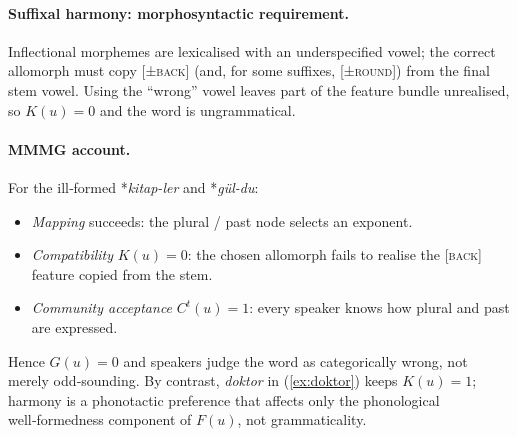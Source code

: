 \documentclass[12pt,letterpaper]{article}
\begin{document}
\paragraph{Suffixal harmony: morphosyntactic requirement.}
Inflectional morphemes are lexicalised with an underspecified vowel;
the correct allomorph must copy \textsc{[±back]} (and, for some
suffixes, \textsc{[±round]}) from the final stem vowel.
Using the ``wrong'' vowel leaves part of the feature bundle unrealised,
so $K(u)=0$ and the word is ungrammatical.

\ea  \label{ex:kitap-pl}
\z
\z

\ea \label{ex:gul-past}
\z
\z

\paragraph{MMMG account.}
For the ill‑formed *\textit{kitap-ler} and *\textit{gül-du}:

\begin{itemize}
\item \emph{Mapping} succeeds: the plural / past node selects an exponent.
\item \emph{Compatibility} $K(u)=0$: the chosen allomorph fails to realise the
      \textsc{[back]} feature copied from the stem.
\item \emph{Community acceptance} $C^t(u)=1$: every speaker knows how plural
      and past are expressed.
\end{itemize}

Hence $G(u)=0$ and speakers judge the word as categorically wrong, not merely
odd‑sounding.  By contrast, \textit{doktor} in (\ref{ex:doktor}) keeps $K(u)=1$;
harmony is a phonotactic preference that affects only the phonological
well‑formedness component of $F(u)$, not grammaticality.
\end{document}
